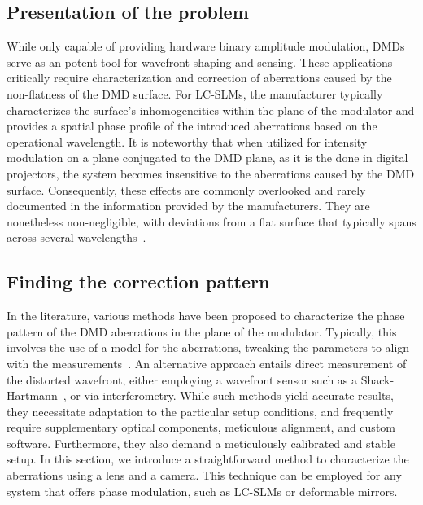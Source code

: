 \documentclass[12pt]{iopart}
\begin{document}
\subsection{Presentation of the problem}

While only capable of providing hardware binary amplitude modulation,
DMDs serve as an potent tool for wavefront shaping and sensing.
These applications  critically require characterization and correction of aberrations
caused by the non-flatness of the DMD surface.
For LC-SLMs, the manufacturer typically characterizes the surface's inhomogeneities within the plane of the modulator and
provides a spatial phase profile of the introduced aberrations based on the operational wavelength.
It is noteworthy that when utilized for intensity modulation on a plane conjugated to the DMD plane,
as it is the done in digital projectors,
the system becomes insensitive to the aberrations caused by the DMD surface.
Consequently, these effects are commonly overlooked and rarely documented in the information provided by the manufacturers.
They are nonetheless non-negligible, with deviations from a flat surface
that typically spans across several wavelengths~\cite{Brown2021multicolor}.\\



\subsection{Finding the correction pattern}

In the literature, various methods have been proposed to characterize
the phase pattern of the DMD aberrations in the plane of the modulator.
Typically, this involves the use of a model for the aberrations,
tweaking the parameters to align with the measurements~\cite{Matthes2019Optical,Scholes2019structured, Brown2021multicolor}.
An alternative approach entails direct measurement of the distorted wavefront,
either employing a wavefront sensor such as a Shack-Hartmann~\cite{Lee2023compensation},
or via interferometry.
While such methods yield accurate results,
they necessitate adaptation to the particular
setup conditions,
and frequently require supplementary optical components,
meticulous alignment,
and custom software.
Furthermore, they also demand
a meticulously calibrated and stable setup.
In this section, we introduce a straightforward method to characterize the aberrations using a lens and a camera.
This technique can be employed for any system that offers phase modulation,
such as LC-SLMs or deformable mirrors. \\
\end{document}
